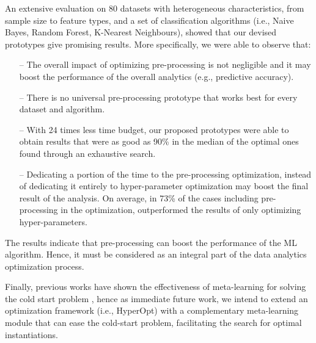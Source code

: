 An extensive evaluation on 80 datasets with heterogeneous characteristics, from sample size to feature types, and a set of classification algorithms (i.e., Naive Bayes, Random Forest, K-Nearest Neighbours), showed that our devised prototypes give promising results.
More specifically, we were able to observe that:
\begin{itemize}
    \item [--] The overall impact of optimizing pre-processing is not negligible and it may boost the performance of the overall analytics (e.g., predictive accuracy).
    \item [--] There is no universal pre-processing prototype that works best for every dataset and algorithm.
    \item [--] With 24 times less time budget, our proposed prototypes were able to obtain results that were as good as 90\% in the median of the optimal ones found through an exhaustive search.
    \item [--] Dedicating a portion of the time to the pre-processing optimization, instead of dedicating it entirely to hyper-parameter optimization may boost %
    the final result of the analysis.
	On average, in 73\% of the cases including pre-processing in the optimization, outperformed the results of only optimizing hyper-parameters.
\end{itemize}

The results indicate that pre-processing can boost the performance of the ML algorithm.
Hence, it must be considered as an integral part of the data analytics optimization process.

Finally, previous works have shown the effectiveness of meta-learning for solving the cold start problem \cite{Feurer15AAAI}, hence as immediate future work, we intend to extend an optimization framework (i.e., HyperOpt) with a complementary meta-learning module that can ease the cold-start problem, facilitating the search for optimal instantiations.